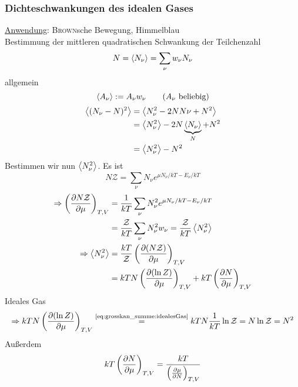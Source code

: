 \subsubsection{Dichteschwankungen des idealen Gases}
\underline{Anwendung}: \textsc{Brown}sche Bewegung, Himmelblau \\[\baselineskip]
Bestimmung der mittleren quadratischen Schwankung der Teilchenzahl \\
\begin{equation}
    N = \left\langle N_\nu\right\rangle = \sum_\nu w_\nu N_\nu
\end{equation}
allgemein
\begin{equation}
    \left\langle A_\nu\right\rangle := A_\nu w_\nu \qquad (A_\nu \text{ beliebig})
\end{equation}
\begin{equation}
    \begin{split}
        \left\langle(N_\nu - N)^2\right\rangle &= \left\langle N_\nu^2 - 2 N N\nu + N^2\right\rangle \\
        &= \left\langle N_\nu^2\right\rangle - 2 N \underbrace{\left\langle N_\nu\right\rangle}_{N} + N^2 \\
        &= \left\langle N_\nu^2\right\rangle - N^2
    \end{split}
\end{equation}
Bestimmen wir nun $\left\langle N_\nu^2\right\rangle$. Es ist
\begin{equation}
    N \mathcal{Z} = \sum_\nu N_\nu e^{\mu N_\nu / kT - E_\nu / kT}
\end{equation}
\begin{equation}
    \begin{split}
        \Rightarrow \left( \frac{\partial N \mathcal{Z}}{\partial \mu} \right)_{T, V}& = \frac{1}{k T} \sum_\nu N_\nu^2 e^{\mu N_\nu / k T - E_\nu / k T} \\
        &= \frac{\mathcal{Z}}{k T} \sum_\nu N_\nu^2 w_\nu = \frac{\mathcal{Z}}{k T} \left\langle N_\nu^2\right\rangle \\
        \Rightarrow \left\langle N_\nu^2\right\rangle &= \frac{k T}{\mathcal{Z}} \left( \frac{\partial (N \mathcal{Z})}{\partial \mu} \right)_{T, V} \\
        &= k T N \left( \frac{\partial (\ln Z)}{\partial \mu} \right)_{T, V} + kT \left( \frac{\partial N}{\partial \mu} \right)_{T, V}
    \end{split}
\end{equation}
Ideales Gas
\begin{equation}
    \Rightarrow k T N \left( \frac{\partial (\ln Z)}{\partial \mu} \right)_{T, V} \overset{\text{\ref{eq:grosskan_summe:idealesGas}}}{=} k T N \frac{1}{k T} \ln \mathcal{Z} = N \ln \mathcal{Z} = N^2
\end{equation}
Außerdem
\begin{equation}
    k T \left( \frac{\partial N}{\partial \mu} \right)_{T, V} = \frac{k T}{\left( \frac{\partial \mu}{\partial N} \right)_{T, V}}
\end{equation}
